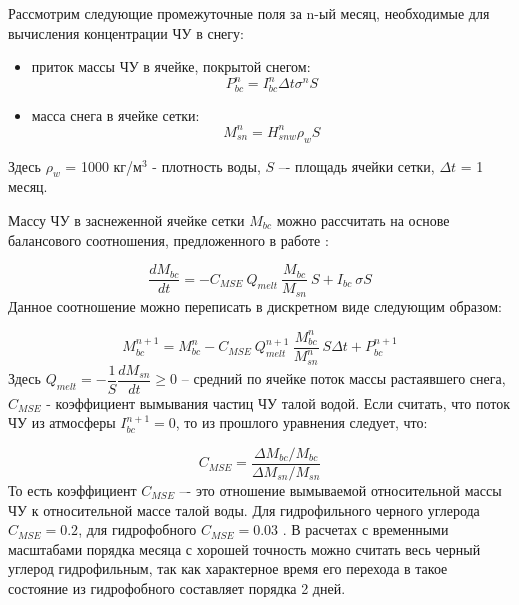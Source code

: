 \documentclass[a4paper, fontsize=14pt]{scrartcl}
\begin{document}
Рассмотрим следующие промежуточные поля за n-ый месяц, необходимые для вычисления концентрации ЧУ в снегу: 
\begin{itemize}
    \item приток массы ЧУ в ячейке, покрытой снегом:
    \begin{equation}
        P_{bc}^n = I_{bc}^n \Delta t \sigma^n S   \label{sys}
    \end{equation}
    \item масса снега в ячейке сетки:
    \begin{equation}
        M_{sn}^n = H_{snw}^n \rho_w S   \label{sys}
    \end{equation}
\end{itemize} 
Здесь $\rho_w$ = 1000 кг/м$^3$ - плотность воды, $S$ –- площадь ячейки сетки, $\Delta t$ = 1 месяц.
    
Массу ЧУ в заснеженной ячейке сетки $M_{bc}$ можно рассчитать на основе балансового соотношения, предложенного в работе \cite{Flanner2007}:

\begin{equation}
    \dfrac{d M_{bc}}{d t} = - C_{MSE} ~ Q_{melt} ~ \dfrac{M_{bc}}{M_{sn}} ~ S + I_{bc} ~ \sigma S     \label{sys}
\end{equation}
Данное соотношение можно переписать в дискретном виде следующим образом:

\begin{equation}
   M_{bc}^{n+1} = M_{bc}^n - C_{MSE} ~ Q_{melt}^{n+1} ~ \dfrac{M_{bc}^n}{M_{sn}^n} ~ S \Delta t + P_{bc}^{n+1}     \label{sysBalance}
\end{equation}
Здесь $Q_{melt} = - \dfrac{1}{S} \dfrac{dM_{sn}}{dt} \geq 0$ --  средний по ячейке поток массы растаявшего снега, $C_{MSE}$ - коэффициент вымывания частиц ЧУ талой водой. Если считать, что поток ЧУ из атмосферы $I_{bc}^{n + 1} = 0$, то из прошлого уравнения следует, что:

\begin{equation}
   C_{MSE} = \dfrac{\Delta M_{bc} / M_{bc}}{\Delta M_{sn} / M_{sn}}     \label{sys}
\end{equation}
То есть коэффициент $C_{MSE}$ –- это отношение вымываемой относительной массы ЧУ к относительной
массе талой воды. Для гидрофильного черного углерода $C_{MSE} = 0.2$, для гидрофобного $C_{MSE} = 0.03$ \cite{Flanner2007, Conway1996}. В расчетах с временными масштабами порядка месяца с хорошей точность можно считать весь черный углерод гидрофильным, так как характерное время его перехода в такое состояние из гидрофобного составляет порядка 2 дней.
\end{document}
